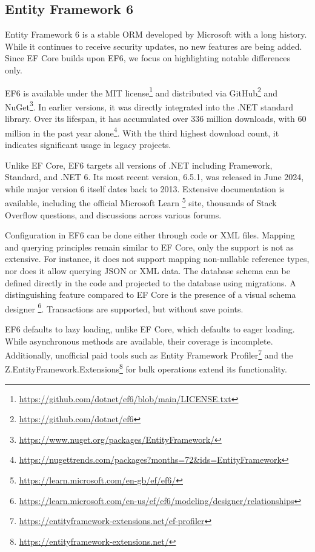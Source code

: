 \subsection{Entity Framework 6}
Entity Framework 6 \cite{ef6, ef6Repo} is a stable ORM developed by Microsoft with a long history. While it continues to receive security updates, no new features are being added. Since EF Core builds upon EF6, we focus on highlighting notable differences only.

EF6 is available under the MIT license\footnote{\url{https://github.com/dotnet/ef6/blob/main/LICENSE.txt}} and distributed via GitHub\footnote{\url{https://github.com/dotnet/ef6}} and NuGet\footnote{\url{https://www.nuget.org/packages/EntityFramework/}}. In earlier versions, it was directly integrated into the .NET standard library. Over its lifespan, it has accumulated over 336 million downloads, with 60 million in the past year alone\footnote{\url{https://nugettrends.com/packages?months=72&ids=EntityFramework}}. With the third highest download count, it indicates significant usage in legacy projects.

Unlike EF Core, EF6 targets all versions of .NET including Framework, Standard, and .NET 6. Its most recent version, 6.5.1, was released in June 2024, while major version 6 itself dates back to 2013. Extensive documentation is available, including the official Microsoft Learn \footnote{\url{https://learn.microsoft.com/en-gb/ef/ef6/}} site, thousands of Stack Overflow questions, and discussions across various forums.

Configuration in EF6 can be done either through code or XML files. Mapping and querying principles remain similar to EF Core, only the support is not as extensive. For instance, it does not support mapping non-nullable reference types, nor does it allow querying JSON or XML data.
The database schema can be defined directly in the code and projected to the database using migrations. A distinguishing feature compared to EF Core is the presence of a visual schema designer \footnote{\url{https://learn.microsoft.com/en-us/ef/ef6/modeling/designer/relationships}}. Transactions are supported, but without save points. 

EF6 defaults to lazy loading, unlike EF Core, which defaults to eager loading. While asynchronous methods are available, their coverage is incomplete. Additionally, unofficial paid tools such as Entity Framework Profiler\footnote{\url{https://entityframework-extensions.net/ef-profiler}} and the Z.EntityFramework.Extensions\footnote{\url{https://entityframework-extensions.net/}} for bulk operations extend its functionality.

